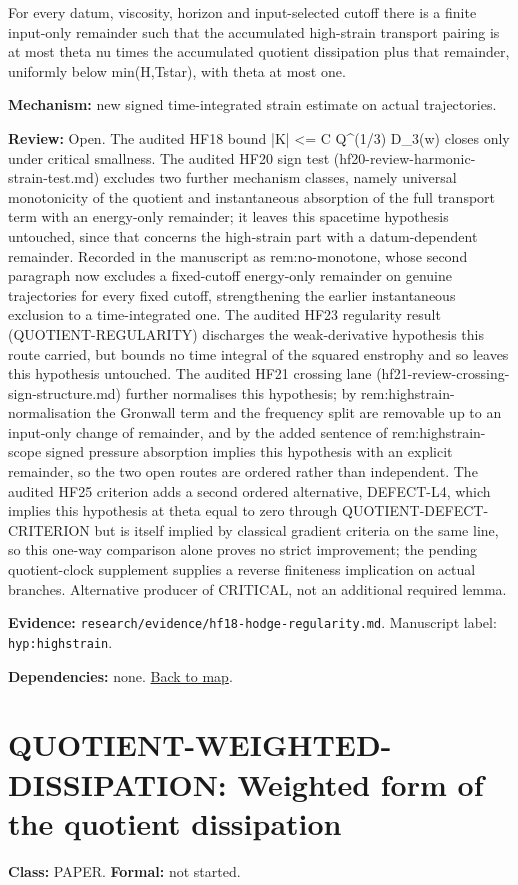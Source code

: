 \documentclass[10pt]{article}
\begin{document}
For every datum, viscosity, horizon and input-selected cutoff there is a finite input-only remainder such that the accumulated high-strain transport pairing is at most theta nu times the accumulated quotient dissipation plus that remainder, uniformly below min(H,Tstar), with theta at most one.

\textbf{Mechanism:} new signed time-integrated strain estimate on actual trajectories.

\textbf{Review:} Open. The audited HF18 bound |K| <= C Q\textasciicircum{}(1/3) D\_3(w) closes only under critical smallness. The audited HF20 sign test (hf20-review-harmonic-strain-test.md) excludes two further mechanism classes, namely universal monotonicity of the quotient and instantaneous absorption of the full transport term with an energy-only remainder; it leaves this spacetime hypothesis untouched, since that concerns the high-strain part with a datum-dependent remainder. Recorded in the manuscript as rem:no-monotone, whose second paragraph now excludes a fixed-cutoff energy-only remainder on genuine trajectories for every fixed cutoff, strengthening the earlier instantaneous exclusion to a time-integrated one. The audited HF23 regularity result (QUOTIENT-REGULARITY) discharges the weak-derivative hypothesis this route carried, but bounds no time integral of the squared enstrophy and so leaves this hypothesis untouched. The audited HF21 crossing lane (hf21-review-crossing-sign-structure.md) further normalises this hypothesis; by rem:highstrain-normalisation the Gronwall term and the frequency split are removable up to an input-only change of remainder, and by the added sentence of rem:highstrain-scope signed pressure absorption implies this hypothesis with an explicit remainder, so the two open routes are ordered rather than independent. The audited HF25 criterion adds a second ordered alternative, DEFECT-L4, which implies this hypothesis at theta equal to zero through QUOTIENT-DEFECT-CRITERION but is itself implied by classical gradient criteria on the same line, so this one-way comparison alone proves no strict improvement; the pending quotient-clock supplement supplies a reverse finiteness implication on actual branches. Alternative producer of CRITICAL, not an additional required lemma.

\textbf{Evidence:} \texttt{research/evidence/hf18-hodge-regularity.md}. Manuscript label: \texttt{hyp:highstrain}.

\textbf{Dependencies:} none. \hyperref[map]{Back to map}.

\section*{QUOTIENT-WEIGHTED-DISSIPATION: Weighted form of the quotient dissipation}\label{node:QUOTIENT-WEIGHTED-DISSIPATION}
\textbf{Class:} PAPER. \textbf{Formal:} not started.
\end{document}
